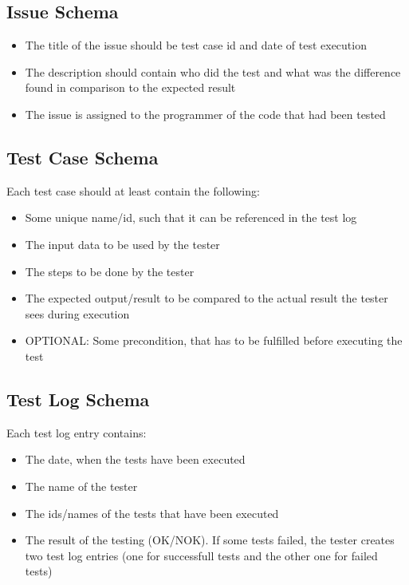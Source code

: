 \documentclass[twoside,12pt,a4paper]{article}
\begin{document}
\newpage

\subsection{Issue Schema} %
\label{sub:issue_schema}

\begin{itemize}
  \item The title of the issue should be test case id and date of test execution
  \item The description should contain who did the test and what was the difference found in comparison to the expected result
  \item The issue is assigned to the programmer of the code that had been tested
\end{itemize}


\subsection{Test Case Schema} %
\label{sub:test_case_schema}

Each test case should at least contain the following:
\begin{itemize}
  \item Some unique name/id, such that it can be referenced in the test log
  \item The input data to be used by the tester
  \item The steps to be done by the tester
  \item The expected output/result to be compared to the actual result the tester sees during execution
  \item OPTIONAL: Some precondition, that has to be fulfilled before executing 
the test
\end{itemize}


\subsection{Test Log Schema} %
\label{sub:test_log_schema}

Each test log entry contains:
\begin{itemize}
  \item The date, when the tests have been executed
  \item The name of the tester
  \item The ids/names of the tests that have been executed
  \item The result of the testing (OK/NOK). If some tests failed, the tester creates two test log entries (one for successfull tests and the other one for failed tests)
\end{itemize}
\end{document}
